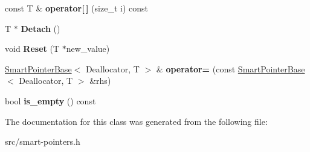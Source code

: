 \begin{DoxyCompactItemize}
\item 
\hypertarget{classv8_1_1internal_1_1_smart_pointer_base_a4d6e17585bdcc1f25f63d9d9886cbcfd}{}const T \& {\bfseries operator\mbox{[}$\,$\mbox{]}} (size\+\_\+t i) const \label{classv8_1_1internal_1_1_smart_pointer_base_a4d6e17585bdcc1f25f63d9d9886cbcfd}

\item 
\hypertarget{classv8_1_1internal_1_1_smart_pointer_base_a40e4af3f1d3c164a1ba3e8f11339a91b}{}T $\ast$ {\bfseries Detach} ()\label{classv8_1_1internal_1_1_smart_pointer_base_a40e4af3f1d3c164a1ba3e8f11339a91b}

\item 
\hypertarget{classv8_1_1internal_1_1_smart_pointer_base_ae577e8de4f73619f636920d5decde9f9}{}void {\bfseries Reset} (T $\ast$new\+\_\+value)\label{classv8_1_1internal_1_1_smart_pointer_base_ae577e8de4f73619f636920d5decde9f9}

\item 
\hypertarget{classv8_1_1internal_1_1_smart_pointer_base_ad3c9a755c6cffa05494313647d51fce2}{}\hyperlink{classv8_1_1internal_1_1_smart_pointer_base}{Smart\+Pointer\+Base}$<$ Deallocator, T $>$ \& {\bfseries operator=} (const \hyperlink{classv8_1_1internal_1_1_smart_pointer_base}{Smart\+Pointer\+Base}$<$ Deallocator, T $>$ \&rhs)\label{classv8_1_1internal_1_1_smart_pointer_base_ad3c9a755c6cffa05494313647d51fce2}

\item 
\hypertarget{classv8_1_1internal_1_1_smart_pointer_base_a4f8d40ee008a8cbf4936bc4550fb5255}{}bool {\bfseries is\+\_\+empty} () const \label{classv8_1_1internal_1_1_smart_pointer_base_a4f8d40ee008a8cbf4936bc4550fb5255}

\end{DoxyCompactItemize}


The documentation for this class was generated from the following file\+:\begin{DoxyCompactItemize}
\item 
src/smart-\/pointers.\+h\end{DoxyCompactItemize}
